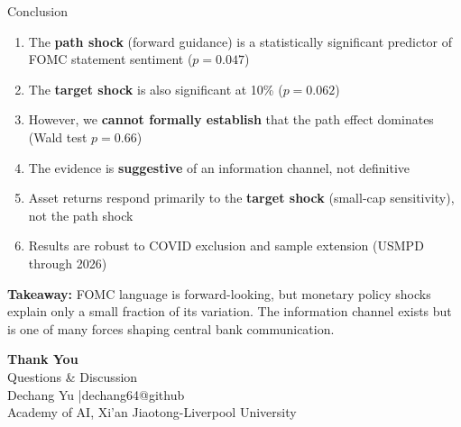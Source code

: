 \documentclass[aspectratio=169, 11pt]{beamer}
\begin{document}
\begin{frame}{Conclusion}
\begin{enumerate}
  \item The \textbf{path shock} (forward guidance) is a statistically significant predictor of FOMC statement sentiment ($p = 0.047$)
  \item The \textbf{target shock} is also significant at 10\% ($p = 0.062$)
  \item However, we \textbf{cannot formally establish} that the path effect dominates (Wald test $p = 0.66$)
  \item The evidence is \textbf{suggestive} of an information channel, not definitive
  \item Asset returns respond primarily to the \textbf{target shock} (small-cap sensitivity), not the path shock
  \item Results are robust to COVID exclusion and sample extension (USMPD through 2026)
\end{enumerate}

\vspace{0.5em}
\centering
\textbf{Takeaway:} FOMC language is forward-looking, but monetary policy shocks explain only a small fraction of its variation. The information channel exists but is one of many forces shaping central bank communication.
\end{frame}

\begin{frame}[plain]
\centering
\vspace{2cm}
{\Huge\bfseries Thank You}\\[1.5em]
{\Large Questions \& Discussion}\\[2em]
{\normalsize Dechang Yu \quad|\quad dechang64@github}\\[0.5em]
{\small Academy of AI, Xi'an Jiaotong-Liverpool University}
\end{frame}

\appendix
\end{document}
